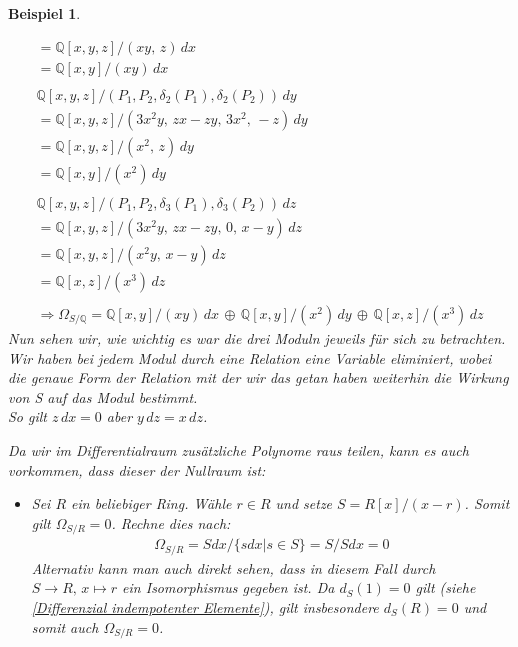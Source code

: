 \documentclass[10pt,a4paper]{report}
\newcounter{Aussage}[chapter]
\newtheorem{bsp}[Aussage]{Beispiel}
\newcommand{\divR}[2]{\Omega_{#1/#2}}
\newcommand{\divf}[1]{d_{#1}}
\begin{document}
\begin{bsp}
\begin{itemize}
{\begin{gather*}
= \mathbb{Q}[x,y,z]/(xy , \, z) \, dx \\
= \mathbb{Q}[x,y]/(xy) \, dx \\
\ \\
\mathbb{Q}[x,y,z]/(P_1,P_2,\delta_2(P_1),\delta_2(P_2)) \, dy \\ 
= \mathbb{Q}[x,y,z]/(3x^2y , \, zx - zy , \, 3x^2 , \, -z) \, dy \\
= \mathbb{Q}[x,y,z]/(x^2 , \, z) \, dy \\
= \mathbb{Q}[x,y]/(x^2) \, dy \\
\ \\
\mathbb{Q}[x,y,z]/(P_1,P_2,\delta_3(P_1),\delta_3(P_2)) \, dz \\ 
= \mathbb{Q}[x,y,z]/(3x^2y , \, zx - zy , \, 0 , \, x - y) \, dz \\
= \mathbb{Q}[x,y,z]/(x^2y , \, x - y) \, dz \\
= \mathbb{Q}[x,z]/(x^3) \, dz \\
\ \\
\Rightarrow \divR{S}{\mathbb{Q}} = \mathbb{Q}[x,y]/(xy) \, dx \, \oplus \, \mathbb{Q}[x,y]/(x^2) \, dy \, \oplus \, \mathbb{Q}[x,z]/(x^3) \, dz
\end{gather*}
Nun sehen wir, wie wichtig es war die drei Moduln jeweils für sich zu betrachten. Wir haben bei jedem Modul durch eine Relation eine Variable eliminiert, wobei die genaue Form der Relation mit der wir das getan haben weiterhin die Wirkung von S auf das Modul  bestimmt.\\
So gilt $z \, dx = 0 $ aber $y \, dz = x \, dz$.
}

\end{itemize}
\begin{em}
Da wir im Differentialraum zusätzliche Polynome raus teilen, kann es auch vorkommen, dass dieser der Nullraum ist:
\end{em}
\begin{itemize}
\item[(2.1)] Sei $R$ ein beliebiger Ring. Wähle $r \in R$ und setze $S = R[x]/(x - r)$. Somit gilt $\divR{S}{R} = 0$. Rechne dies nach:
\begin{gather*}
\divR{S}{R} = Sdx/\lbrace s dx \vert s \in S \rbrace = S/S dx = 0
\end{gather*}
Alternativ kann man auch direkt sehen, dass in diesem Fall durch\\
$S \longrightarrow R, \, x \longmapsto r$ ein Isomorphismus gegeben ist. Da $\divf{S}(1) = 0$ gilt \textit{(siehe \cref{Differenzial indempotenter Elemente})}, gilt insbesondere $\divf{S}(R) = 0$ und somit auch $\divR{S}{R} = 0$.


\end{itemize}
\end{bsp}
\end{document}
